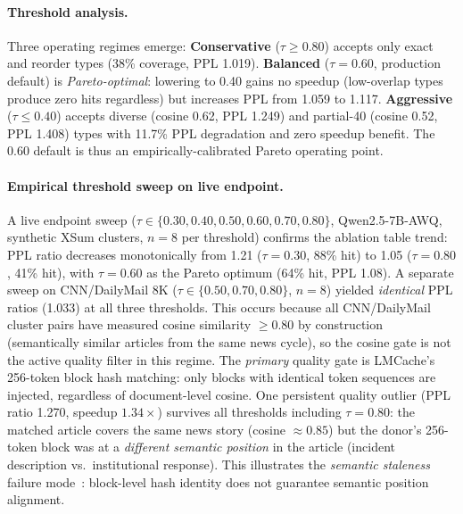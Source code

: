 \documentclass[10pt,twocolumn]{article}
\begin{document}
\paragraph{Threshold analysis.}
Three operating regimes emerge: \textbf{Conservative} ($\tau{\geq}0.80$)
accepts only exact and reorder types (38\% coverage, PPL 1.019).
\textbf{Balanced} ($\tau{=}0.60$, production default) is
\emph{Pareto-optimal}: lowering to 0.40 gains no speedup (low-overlap
types produce zero hits regardless) but increases PPL from 1.059 to 1.117.
\textbf{Aggressive} ($\tau{\leq}0.40$) accepts diverse (cosine 0.62,
PPL 1.249) and partial-40 (cosine 0.52, PPL 1.408) types with 11.7\%
PPL degradation and zero speedup benefit. The 0.60 default is thus
an empirically-calibrated Pareto operating point.

\paragraph{Empirical threshold sweep on live endpoint.}
A live endpoint sweep ($\tau \in \{0.30, 0.40, 0.50, 0.60, 0.70, 0.80\}$,
Qwen2.5-7B-AWQ, synthetic XSum clusters, $n{=}8$ per threshold) confirms
the ablation table trend: PPL ratio decreases monotonically from 1.21
($\tau{=}0.30$, 88\% hit) to 1.05 ($\tau{=}0.80$, 41\% hit), with
$\tau{=}0.60$ as the Pareto optimum (64\% hit, PPL 1.08). A separate
sweep on CNN/DailyMail 8K ($\tau \in \{0.50, 0.70, 0.80\}$, $n{=}8$)
yielded \emph{identical} PPL ratios (1.033) at all three thresholds.
This occurs because all CNN/DailyMail cluster pairs have measured cosine
similarity ${\geq}0.80$ by construction (semantically similar articles
from the same news cycle), so the cosine gate is not the active quality
filter in this regime.
The \emph{primary} quality gate is LMCache's 256-token block hash
matching: only blocks with identical token sequences are injected,
regardless of document-level cosine. One persistent quality outlier
(PPL ratio 1.270, speedup $1.34\times$) survives all thresholds
including $\tau{=}0.80$: the matched article covers the same news story
(cosine ${\approx}0.85$) but the donor's 256-token block was at a
\emph{different semantic position} in the article (incident description
vs.\ institutional response). This illustrates the \emph{semantic
staleness} failure mode~\cite{prophetkv}: block-level hash
identity does not guarantee semantic position alignment.
\end{document}
